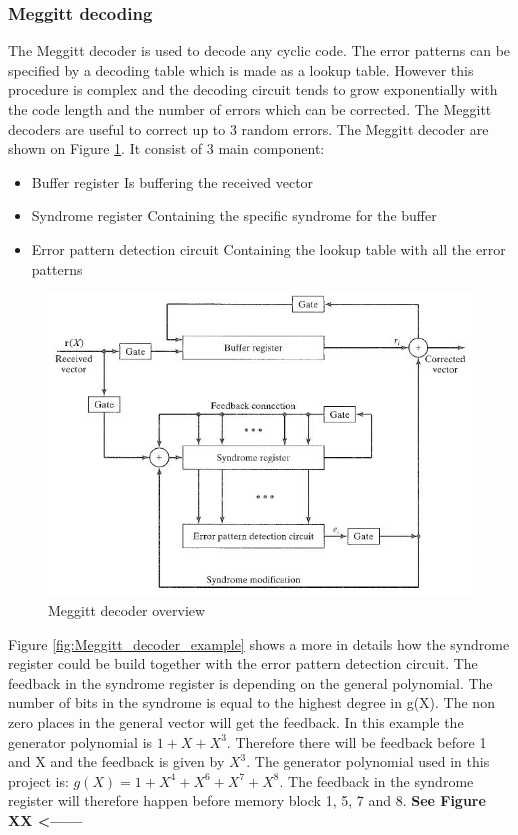 \documentclass[Main]{subfiles}
\begin{document}
\subsubsection{Meggitt decoding} 
The Meggitt decoder is used to decode any cyclic code. The error patterns can be specified by a decoding table which is made as a lookup table.
However this procedure is complex and the decoding circuit tends to grow exponentially with the code length and the number of errors which can be corrected.
The Meggitt decoders are useful to correct up to 3 random errors.
The Meggitt decoder are shown on Figure \ref{fig:Meggitt_decoder}. It consist of 3 main component:
\begin{itemize}
\item Buffer register
\subitem Is buffering the received vector
\item Syndrome register
\subitem Containing the specific syndrome for the buffer
\item Error pattern detection circuit
\subitem Containing the lookup table with all the error patterns
\end{itemize}

\begin{figure}[h!]
\centering
\includegraphics[width=0.7\linewidth]{./Picture/Meggitt_decoder}
\caption[The Meggitt decoder]{Meggitt decoder overview}
\label{fig:Meggitt_decoder}
\end{figure}
Figure \ref{fig:Meggitt_decoder_example} shows a more in details how the syndrome register could be build together with the error pattern detection circuit.
The feedback in the syndrome register is depending on the general polynomial.
The number of bits in the syndrome is equal to the highest degree in g(X).
The non zero places in the general vector will get the feedback.
In this example the generator polynomial is $1+X+X^3$.
Therefore there will be feedback before 1 and X and the feedback is given by $X^3$.
The generator polynomial used in this project is: $g(X)=1+X^4+X^6+X^7+X^8$.
The feedback in the syndrome register will therefore happen before memory block 1, 5, 7 and 8. \textbf{See Figure XX <------}
\end{document}

